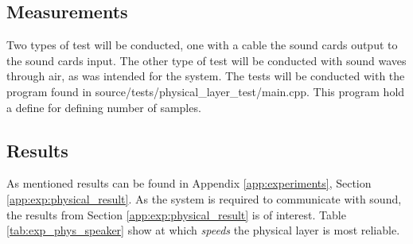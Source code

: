 	\subsection{Measurements}
	Two types of test will be conducted, one with a cable the sound cards output to the sound cards input. The other type of test will be conducted with sound waves through air, as was intended for the system.
	The tests will be conducted with the program found in source/tests/physical\_layer\_test/main.cpp. This program hold a define for defining number of samples.
	
	\subsection{Results}
	As mentioned results can be found in Appendix \ref{app:experiments}, Section \ref{app:exp:physical_result}. As the system is required to communicate with sound, the results from Section \ref{app:exp:physical_result} is of interest. Table \ref{tab:exp_phys_speaker} show at which \textit{speeds} the physical layer is most reliable.